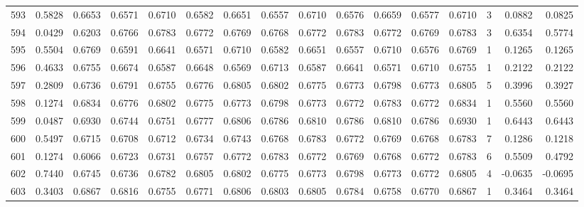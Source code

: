 \begin{tabular}{lrrrrrrrrrrrrrrr}
593 &      0.5828 &  0.6653 &  0.6571 &  0.6710 &  0.6582 &  0.6651 &  0.6557 &  0.6710 &  0.6576 &  0.6659 &   0.6577 &     0.6710 &      3 &                    0.0882 &                     0.0825 \\
594 &      0.0429 &  0.6203 &  0.6766 &  0.6783 &  0.6772 &  0.6769 &  0.6768 &  0.6772 &  0.6783 &  0.6772 &   0.6769 &     0.6783 &      3 &                    0.6354 &                     0.5774 \\
595 &      0.5504 &  0.6769 &  0.6591 &  0.6641 &  0.6571 &  0.6710 &  0.6582 &  0.6651 &  0.6557 &  0.6710 &   0.6576 &     0.6769 &      1 &                    0.1265 &                     0.1265 \\
596 &      0.4633 &  0.6755 &  0.6674 &  0.6587 &  0.6648 &  0.6569 &  0.6713 &  0.6587 &  0.6641 &  0.6571 &   0.6710 &     0.6755 &      1 &                    0.2122 &                     0.2122 \\
597 &      0.2809 &  0.6736 &  0.6791 &  0.6755 &  0.6776 &  0.6805 &  0.6802 &  0.6775 &  0.6773 &  0.6798 &   0.6773 &     0.6805 &      5 &                    0.3996 &                     0.3927 \\
598 &      0.1274 &  0.6834 &  0.6776 &  0.6802 &  0.6775 &  0.6773 &  0.6798 &  0.6773 &  0.6772 &  0.6783 &   0.6772 &     0.6834 &      1 &                    0.5560 &                     0.5560 \\
599 &      0.0487 &  0.6930 &  0.6744 &  0.6751 &  0.6777 &  0.6806 &  0.6786 &  0.6810 &  0.6786 &  0.6810 &   0.6786 &     0.6930 &      1 &                    0.6443 &                     0.6443 \\
600 &      0.5497 &  0.6715 &  0.6708 &  0.6712 &  0.6734 &  0.6743 &  0.6768 &  0.6783 &  0.6772 &  0.6769 &   0.6768 &     0.6783 &      7 &                    0.1286 &                     0.1218 \\
601 &      0.1274 &  0.6066 &  0.6723 &  0.6731 &  0.6757 &  0.6772 &  0.6783 &  0.6772 &  0.6769 &  0.6768 &   0.6772 &     0.6783 &      6 &                    0.5509 &                     0.4792 \\
602 &      0.7440 &  0.6745 &  0.6736 &  0.6782 &  0.6805 &  0.6802 &  0.6775 &  0.6773 &  0.6798 &  0.6773 &   0.6772 &     0.6805 &      4 &                   -0.0635 &                    -0.0695 \\
603 &      0.3403 &  0.6867 &  0.6816 &  0.6755 &  0.6771 &  0.6806 &  0.6803 &  0.6805 &  0.6784 &  0.6758 &   0.6770 &     0.6867 &      1 &                    0.3464 &                     0.3464 \\

\end{tabular}
